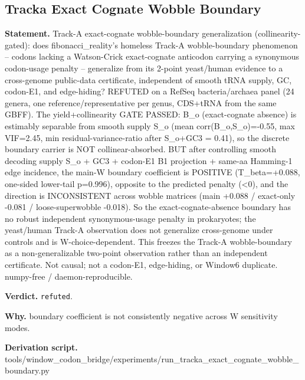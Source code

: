 \subsection{Tracka Exact Cognate Wobble Boundary}\label{sec:bridge-tracka-exact-cognate-wobble-boundary}
\textbf{Statement.} Track-A exact-cognate wobble-boundary generalization (collinearity-gated): does fibonacci\_reality's
homeless Track-A wobble-boundary phenomenon -- codons lacking a Watson-Crick exact-cognate anticodon
carrying a synonymous codon-usage penalty -- generalize from its 2-point yeast/human evidence to a
cross-genome public-data certificate, independent of smooth tRNA supply, GC, codon-E1, and
edge-hiding? REFUTED on a RefSeq bacteria/archaea panel (24 genera, one reference/representative per
genus, CDS+tRNA from the same GBFF). The yield+collinearity GATE PASSED: B\_o (exact-cognate
absence) is estimably separable from smooth supply S\_o (mean corr(B\_o,S\_o)=-0.55, max VIF=2.45,
min residual-variance-ratio after S\_o+GC3 = 0.41), so the discrete boundary carrier is NOT
collinear-absorbed. BUT after controlling smooth decoding supply S\_o + GC3 + codon-E1 B1 projection
+ same-aa Hamming-1 edge incidence, the main-W boundary coefficient is POSITIVE (T\_beta=+0.088,
one-sided lower-tail p=0.996), opposite to the predicted penalty (<0), and the direction is
INCONSISTENT across wobble matrices (main +0.088 / exact-only -0.081 / loose-superwobble -0.018). So
the exact-cognate-absence boundary has no robust independent synonymous-usage penalty in
prokaryotes; the yeast/human Track-A observation does not generalize cross-genome under controls and
is W-choice-dependent. This freezes the Track-A wobble-boundary as a non-generalizable two-point
observation rather than an independent certificate. Not causal; not a codon-E1, edge-hiding, or
Window6 duplicate. numpy-free / daemon-reproducible.

\textbf{Verdict.} \texttt{refuted}.

\textbf{Why.} boundary coefficient is not consistently negative across W sensitivity modes.

\textbf{Derivation script.} tools/window\_codon\_bridge/experiments/run\_tracka\_exact\_cognate\_wobble\_boundary.py

